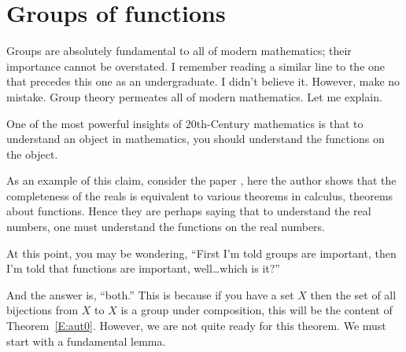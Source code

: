 \documentclass{ximera}
\begin{document}

\section{Groups of functions}

Groups are absolutely fundamental to all of modern mathematics; their
importance cannot be overstated. I remember reading a similar line to
the one that precedes this one as an undergraduate. I didn't believe
it. However, make no mistake. Group theory permeates all of modern
mathematics. Let me explain.

One of the most powerful insights of 20th-Century mathematics is that
to understand an object in mathematics, you should understand the
functions on the object.

As an example of this claim, consider the paper , here the
author shows that the completeness of the reals is equivalent to
various theorems in calculus, theorems about functions. Hence they are
perhaps saying that to understand the real numbers, one must
understand the functions on the real numbers.

At this point, you may be wondering, ``First I'm told groups are
important, then I'm told that functions are important, well\dots which
is it?''

And the answer is, ``both.'' This is because if you have a set $X$
then the set of all bijections from $X$ to $X$ is a group under
composition, this will be the content of
Theorem~\ref{E:aut0}. However, we are not quite ready for this
theorem. We must start with a fundamental lemma.
\end{document}
